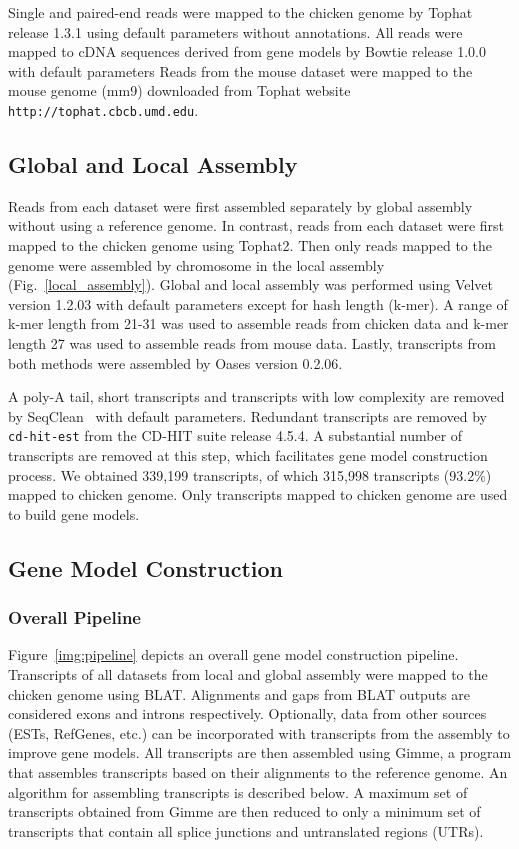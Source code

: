 \documentclass[10pt]{article}
\begin{document}
Single and paired-end reads were mapped to the chicken genome by
Tophat\cite{Trapnell:2009dp} release 1.3.1 using default parameters without
annotations.  All reads were mapped to cDNA sequences derived from gene models
by Bowtie\cite{Langmead:2009fv} release 1.0.0 with default parameters Reads from the
mouse dataset were mapped to the mouse genome (mm9) downloaded from Tophat
website \texttt{http://tophat.cbcb.umd.edu}.

\subsection*{Global and Local Assembly}

Reads from each dataset were first assembled separately by global assembly
without using a reference genome.  In contrast, reads from each dataset were
first mapped to the chicken genome using Tophat2.  Then only reads mapped to
the genome were assembled by chromosome in the local assembly
(Fig.~\ref{local_assembly}).  Global and local assembly was performed using
Velvet version 1.2.03\cite{Zerbino:2008vu} with default parameters except for
hash length (k-mer).  A range of k-mer length from 21-31 was used to assemble
reads from chicken data and k-mer length 27 was used to assemble reads from
mouse data.  Lastly, transcripts from both methods were assembled by Oases
version 0.2.06\cite{Schulz:2012je}.

A poly-A tail, short transcripts and transcripts with low complexity are
removed by SeqClean~\cite{seqclean} with default parameters.  Redundant
transcripts are removed by \texttt{cd-hit-est} from the CD-HIT
suite\cite{Li:2006hr} release 4.5.4.  A substantial number of transcripts are
removed at this step, which facilitates gene model construction process.  We
obtained 339,199 transcripts, of which 315,998 transcripts (93.2\%) mapped to
chicken genome.  Only transcripts mapped to chicken genome are used to build
gene models.

\subsection*{Gene Model Construction}

\subsubsection*{Overall Pipeline}

Figure~\ref{img:pipeline} depicts an overall gene model construction
pipeline.  Transcripts of all datasets from local and global assembly were
mapped to the chicken genome using BLAT\cite{Kent:2002tv}. Alignments and gaps
from BLAT outputs are considered exons and introns respectively.  Optionally,
data from other sources (ESTs, RefGenes, etc.) can be incorporated with
transcripts from the assembly to improve gene models.  All transcripts are then
assembled using Gimme, a program that assembles transcripts based on their
alignments to the reference genome.  An algorithm for assembling transcripts is
described below.  A maximum set of transcripts obtained from Gimme are then
reduced to only a minimum set of transcripts that contain all splice junctions
and untranslated regions (UTRs).
\end{document}
